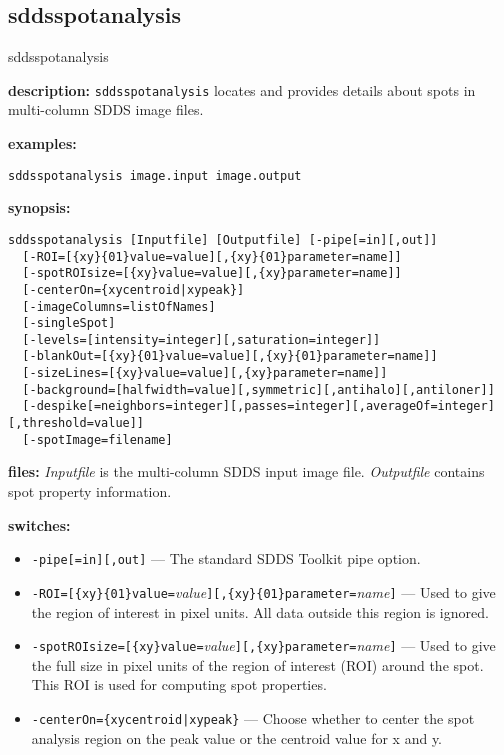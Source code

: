%
\newpage
\subsection{sddsspotanalysis}
\label{sddsspotanalysis}

\begin{sddsprog}{sddsspotanalysis}
  \item \textbf{description:} \verb|sddsspotanalysis| locates and provides details about spots in multi-column SDDS image files.
  \item \textbf{examples:}
    \begin{verbatim}
sddsspotanalysis image.input image.output
    \end{verbatim}
  \item \textbf{synopsis:}
    \begin{verbatim}
sddsspotanalysis [Inputfile] [Outputfile] [-pipe[=in][,out]]
  [-ROI=[{xy}{01}value=value][,{xy}{01}parameter=name]]
  [-spotROIsize=[{xy}value=value][,{xy}parameter=name]]
  [-centerOn={xycentroid|xypeak}]
  [-imageColumns=listOfNames]
  [-singleSpot]
  [-levels=[intensity=integer][,saturation=integer]]
  [-blankOut=[{xy}{01}value=value][,{xy}{01}parameter=name]]
  [-sizeLines=[{xy}value=value][,{xy}parameter=name]]
  [-background=[halfwidth=value][,symmetric][,antihalo][,antiloner]]
  [-despike[=neighbors=integer][,passes=integer][,averageOf=integer][,threshold=value]]
  [-spotImage=filename]
    \end{verbatim}
  \item \textbf{files:}
    \emph{Inputfile} is the multi-column SDDS input image file.
    \emph{Outputfile} contains spot property information.
  \item \textbf{switches:}
    \begin{itemize}
      \item \verb|-pipe[=in][,out]| --- The standard SDDS Toolkit pipe option.
      \item \verb|-ROI=[{xy}{01}value=|{\em value}\verb|][,{xy}{01}parameter=|{\em name}\verb|]| --- Used to give the region of interest in pixel units. All data outside this region is ignored.
      \item \verb|-spotROIsize=[{xy}value=|{\em value}\verb|][,{xy}parameter=|{\em name}\verb|]| --- Used to give the full size in pixel units of the region of interest (ROI) around the spot. This ROI is used for computing spot properties.
      \item \verb!-centerOn={xycentroid|xypeak}! --- Choose whether to center the spot analysis region on the peak value or the centroid value for x and y.

\end{itemize}
\end{sddsprog}
